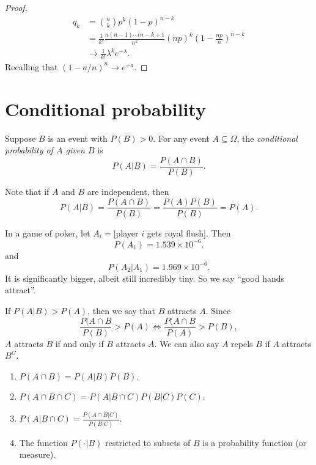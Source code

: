 \documentclass[a4paper]{article}
\begin{document}
\begin{proof}
\begin{align*}
  q_k &= \binom{n}{k}p^k(1 - p)^{n - k}\\
  &= \frac{1}{k!} \frac{n(n - 1)\cdots(n - k + 1}{n^k}(np)^k \left(1 - \frac{np}{n}\right)^{n - k}\\
  &\to \frac{1}{k!}\lambda^ke^{-\lambda}.
\end{align*}
Recalling that $(1 - a/n)^n \to e^{-a}$.
\end{proof}
\section{Conditional probability}
\begin{defi}
  Suppose $B$ is an event with $P(B) > 0$. For any event $A\subseteq \Omega$, the \emph{conditional probability of $A$ given $B$} is
  \[
    P(A|B) = \frac{P(A\cap B)}{P(B)}.
  \]
\end{defi}
Note that if $A$ and $B$ are independent, then
\[
  P(A|B) = \frac{P(A\cap B)}{P(B)} = \frac{P(A)P(B)}{P(B)} = P(A).
\]
\begin{eg}
  In a game of poker, let $A_i = [$player $i$ gets royal flush$]$. Then
  \[
    P(A_1) = 1.539\times 10^{-6}.
  \]
  and
  \[
    P(A_2|A_1) = 1.969\times 10^{-6}.
  \]
  It is significantly bigger, albeit still incredibly tiny. So we say ``good hands attract''.
  
  If $P(A|B) > P(A)$, then we say that $B$ attracts $A$. Since
  \[
    \frac{P(A\cap B}{P(B)} > P(A) \Leftrightarrow \frac{P(A\cap B}{P(A)} > P(B),
  \]
  $A$ attracts $B$ if and only if $B$ attracts $A$. We can also say $A$ repels $B$ if $A$ attracts $B^C$.
\end{eg}
\begin{thm}\leavevmode
  \begin{enumerate}
    \item $P(A\cap B) = P(A|B)P(B)$.
    \item $P(A\cap B\cap C) = P(A|B\cap C) P(B|C) P(C)$.
    \item $P(A|B\cap C) = \frac{P(A\cap B|C)}{P(B|C)}$.
    \item The function $P(\cdot |B)$ restricted to subsets of $B$ is a probability function (or measure).
  \end{enumerate}
\end{thm}
\end{document}
